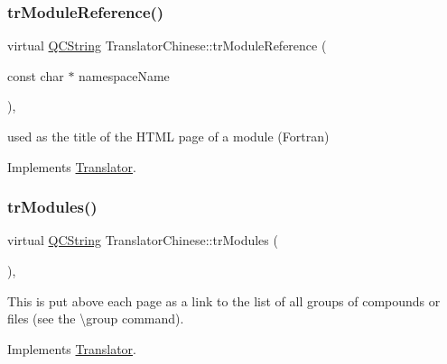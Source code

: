 \mbox{\label{class_translator_chinese_a9dad8400318638a97741ea6548d63ab6}} 
\subsubsection{\texorpdfstring{trModuleReference()}{trModuleReference()}}
{\footnotesize\ttfamily virtual \mbox{\hyperlink{class_q_c_string}{Q\+C\+String}} Translator\+Chinese\+::tr\+Module\+Reference (\begin{DoxyParamCaption}\item[{const char $\ast$}]{namespace\+Name }\end{DoxyParamCaption})\hspace{0.3cm}{\ttfamily [inline]}, {\ttfamily [virtual]}}

used as the title of the H\+T\+ML page of a module (Fortran) 

Implements \mbox{\hyperlink{class_translator}{Translator}}.

\mbox{\label{class_translator_chinese_a54a38c1d58a1747f726df92a5ce1e59a}} 
\subsubsection{\texorpdfstring{trModules()}{trModules()}}
{\footnotesize\ttfamily virtual \mbox{\hyperlink{class_q_c_string}{Q\+C\+String}} Translator\+Chinese\+::tr\+Modules (\begin{DoxyParamCaption}{ }\end{DoxyParamCaption})\hspace{0.3cm}{\ttfamily [inline]}, {\ttfamily [virtual]}}

This is put above each page as a link to the list of all groups of compounds or files (see the \textbackslash{}group command). 

Implements \mbox{\hyperlink{class_translator}{Translator}}.

\mbox{\label{class_translator_chinese_a87ceeb90f60f6a22b0f75310036c49bc}} 
